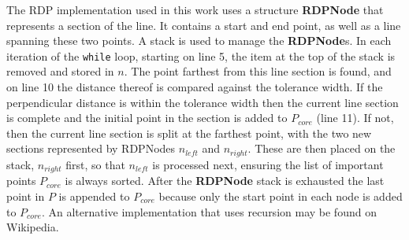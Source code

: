 The RDP implementation used in this work uses a structure \textbf{RDPNode} that represents a section of the line.
It contains a start and end point, as well as a line spanning these two points.
A stack is used to manage the \textbf{RDPNode}s.
In each iteration of the \verb|while| loop, starting on line 5, the item at the top of the stack is removed and stored in $n$.
The point farthest from this line section is found, and on line 10 the distance thereof is compared against the tolerance width.
If the perpendicular distance is within the tolerance width then the current line section is complete and the initial point in the section is added to $P_{core}$ (line 11).
If not, then the current line section is split at the farthest point, with the two new sections represented by RDPNodes $n_{left}$ and $n_{right}$.
These are then placed on the stack, $n_{right}$ first, so that $n_{left}$ is processed next, ensuring the list of important points $P_{core}$ is always sorted.
After the \textbf{RDPNode} stack is exhausted the last point in $P$ is appended to $P_{core}$ because only the start point in each node is added to $P_{core}$.
An alternative implementation that uses recursion may be found on Wikipedia.

